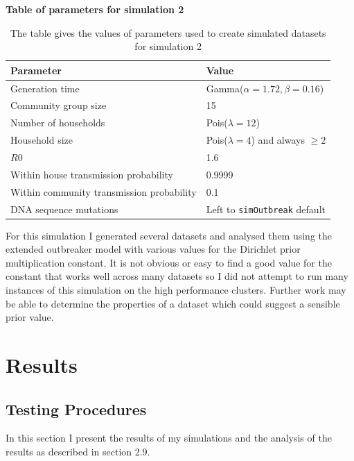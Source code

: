 \documentclass[11pt,a4paper]{report}
\begin{document}
\begin{table}[h!]
\centering
{\bf Table of parameters for simulation 2}
\caption{The table gives the values of parameters used to create simulated datasets for simulation 2}
\begin{tabular}{|l|l|}
\hline
Parameter & Value \\
\hline
Generation time & Gamma($\alpha = 1.72	,\beta=0.16$) \\
\hline
Community group size & 15 \\
\hline
Number of households & Pois($\lambda=12$) \\
\hline
Household size & Pois($\lambda=4$) and always $\geq 2$ \\
\hline
$R0$ & 1.6 \\
\hline
Within house transmission probability & 0.9999 \\
\hline
Within community transmission probability & 0.1 \\
\hline
DNA sequence mutations & Left to {\tt simOutbreak} default \\
\hline
\end{tabular}
\end{table}

For this simulation I generated several datasets and analysed them using the extended outbreaker model with various values for the Dirichlet prior multiplication constant. It is not obvious or easy to find a good value for the constant that works well across many datasets so I did not attempt to run many instances of this simulation on the high performance clusters. Further work may be able to determine the properties of a dataset which could suggest a sensible prior value.



\chapter{Results}
\section{Testing Procedures}
In this section I present the results of my simulations and the analysis of the results as described in section 2.9.
\end{document}
